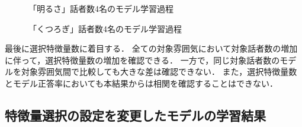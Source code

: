 \begin{figure}
    \centering
    \caption{「明るさ」話者数4名のモデル学習過程}
    \label{fig:che4}
\end{figure}

\begin{figure}
    \centering
    \caption{「くつろぎ」話者数4名のモデル学習過程}
    \label{fig:com4}
\end{figure}

最後に選択特徴量数に着目する．
全ての対象雰囲気において対象話者数の増加に伴って，選択特徴量数の増加を確認できる．
一方で，同じ対象話者数のモデルを対象雰囲気間で比較しても大きな差は確認できない．
また，選択特徴量数とモデル正答率においても本結果からは相関を確認することはできない．

\subsection{特徴量選択の設定を変更したモデルの学習結果\label{item:learning_result_with_ga_change_params}}

